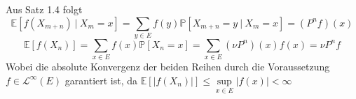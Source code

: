 Aus Satz 1.4 folgt
\begin{equation*}
\mathbb{E}[f(X_{m+n}) \: | \: X_{m} = x] = \sum_{y \in E} f(y)\mathbb{P}[X_{m+n} = y \: | \: X_{m} = x] = (P^{n}f)(x)
\end{equation*}
\begin{equation*}
\mathbb{E}[f(X_{n})] = \sum_{x \in E} f(x) \mathbb{P}[X_{n} = x] = \sum_{x \in E} (\nu P^{n})(x) f(x) = \nu P^{n}f
\end{equation*}
Wobei die absolute Konvergenz der beiden Reihen durch die Voraussetzung $f \in \mathcal{L}^{\infty}(E) $ garantiert ist, da $\mathbb{E}[|f(X_{n})|] \leq \sup\limits_{x \in E} |f(x)| < \infty$